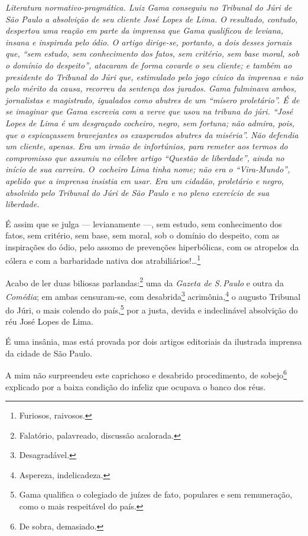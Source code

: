 \begin{resumo}
\emph{Literatura normativo-pragmática. Luiz Gama conseguiu no Tribunal
do Júri de São Paulo a absolvição de seu cliente José Lopes de Lima. O
resultado, contudo, despertou uma reação em parte da imprensa que Gama
qualificou de leviana, insana e inspirada pelo ódio. O artigo
dirige-se, portanto, a dois desses jornais que, ``sem estudo, sem
conhecimento dos fatos, sem critério, sem base moral, sob o domínio do
despeito'', atacaram de forma covarde o seu cliente; e também ao
presidente do Tribunal do Júri que, estimulado pelo jogo cínico da
imprensa e não pelo mérito da causa, recorreu da sentença dos jurados.
Gama fulminava ambos, jornalistas e magistrado, igualados como abutres
de um ``mísero proletário''. É de se imaginar que Gama escrevia com a
verve que usou na tribuna do júri. ``José Lopes de Lima é um desgraçado
cocheiro, negro, sem fortuna; não admira, pois, que o espicaçassem
bravejantes os exasperados abutres da miséria''. Não defendia um cliente,
apenas. Era um irmão de infortúnios, para remeter aos termos do
compromisso que assumiu no célebre artigo ``Questão de liberdade'', ainda no início de sua carreira. O~cocheiro Lima tinha nome; não era o ``Vira-Mundo'', apelido que a imprensa insistia em usar. Era um
cidadão, proletário e negro, absolvido pelo Tribunal do Júri de São
Paulo e no pleno exercício de sua liberdade. }
\end{resumo}

É assim que se julga --- levianamente ---, sem estudo, sem
conhecimento dos fatos, sem critério, sem base, sem moral, sob o domínio
do despeito, com as inspirações do ódio, pelo assomo de prevenções
hiperbólicas, com os atropelos da cólera e com a barbaridade nativa dos
atrabiliários!\ldots{}\footnote{Furiosos, raivosos.}

Acabo de ler duas biliosas parlandas:\footnote{Falatório, palavreado,
  discussão acalorada.} uma da \textit{Gazeta de S.\,Paulo} e outra da
\textit{Comédia}; em ambas censuram-se, com desabrida\footnote{
  Desagradável.} acrimônia,\footnote{Aspereza, indelicadeza.} o
augusto Tribunal do Júri, o mais colendo do país,\footnote{Gama
  qualifica o colegiado de juízes de fato, populares e sem remuneração,
  como o mais respeitável do país.} por a justa, devida e indeclinável
absolvição do réu José Lopes de Lima.

É uma insânia, mas está provada por dois artigos editoriais da ilustrada
imprensa da cidade de São Paulo.

A mim não surpreendeu este caprichoso e desabrido procedimento, de
sobejo\footnote{De sobra, demasiado.} explicado por a baixa condição
do infeliz que ocupava o banco dos réus.

